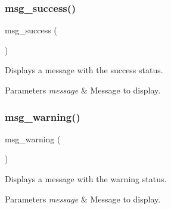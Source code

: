 \subsubsection{\texorpdfstring{msg\+\_\+success()}{msg\_success()}}
{\footnotesize\ttfamily msg\+\_\+success (\begin{DoxyParamCaption}\item[{message}]{ }\end{DoxyParamCaption})}



Displays a message with the \textquotesingle{}success\textquotesingle{} status. 


\begin{DoxyParams}{Parameters}
{\em message} & Message to display. \\
\hline
\end{DoxyParams}
\mbox{\label{group__message_gae7ed668c9e2b1cf86059082cc6e28024}} 
\subsubsection{\texorpdfstring{msg\+\_\+warning()}{msg\_warning()}}
{\footnotesize\ttfamily msg\+\_\+warning (\begin{DoxyParamCaption}\item[{message}]{ }\end{DoxyParamCaption})}



Displays a message with the \textquotesingle{}warning\textquotesingle{} status. 


\begin{DoxyParams}{Parameters}
{\em message} & Message to display. \\
\hline
\end{DoxyParams}
